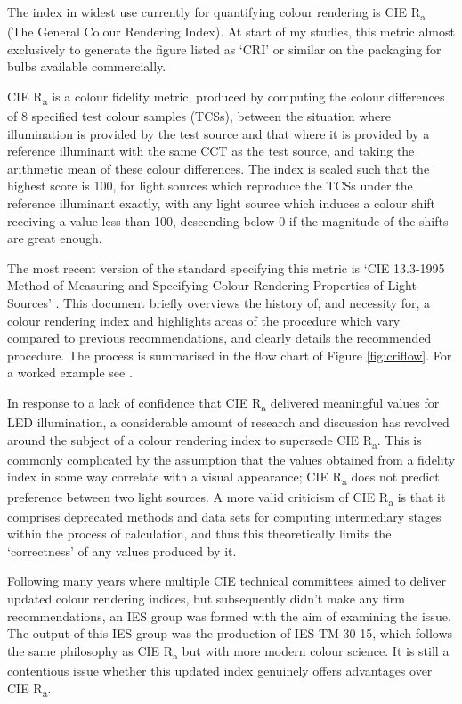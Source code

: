 The index in widest use currently for quantifying colour rendering is CIE R\textsubscript{a} (The General Colour Rendering Index). At start of my studies, this metric almost exclusively to generate the figure listed as `CRI' or similar on the packaging for bulbs available commercially. %

CIE R\textsubscript{a} is a colour fidelity metric, produced by computing the colour differences of 8 specified test colour samples (TCSs), between the situation where illumination is provided by the test source and that where it is provided by a reference illuminant with the same \gls{CCT} as the test source, and taking the arithmetic mean of these colour differences. The index is scaled such that the highest score is 100, for light sources which reproduce the TCSs under the reference illuminant exactly, with any light source which induces a colour shift receiving a value less than 100, descending below 0 if the magnitude of the shifts are great enough.

The most recent version of the standard specifying this metric is `CIE 13.3-1995 Method of Measuring and Specifying Colour Rendering Properties of Light Sources' \citep{cie_cie_1995}. This document briefly overviews the history of, and necessity for, a colour rendering index and highlights areas of the procedure which vary compared to previous recommendations, and clearly details the recommended procedure. The process is summarised in the flow chart of Figure \ref{fig:criflow}. For a worked example see \citet[p.388]{hunt_measuring_2011}.

In response to a lack of confidence that CIE R\textsubscript{a} delivered meaningful values for LED illumination, a considerable amount of research and discussion has revolved around the subject of a colour rendering index to supersede CIE R\textsubscript{a}. This is commonly complicated by the assumption that the values obtained from a fidelity index in some way correlate with a visual appearance; CIE R\textsubscript{a} does not predict preference between two light sources. A more valid criticism of CIE R\textsubscript{a} is that it comprises deprecated methods and data sets for computing intermediary stages within the process of calculation, and thus this theoretically limits the `correctness' of any values produced by it.

Following many years where multiple CIE technical committees aimed to deliver updated colour rendering indices, but subsequently didn't make any firm recommendations, an IES group was formed with the aim of examining the issue. The output of this IES group was the production of IES TM-30-15\cite{color_metric_task_group_of_the_ies_ies_2015}, which follows the same philosophy as CIE R\textsubscript{a} but with more modern colour science. It is still a contentious issue whether this updated index genuinely offers advantages over CIE R\textsubscript{a}. 

